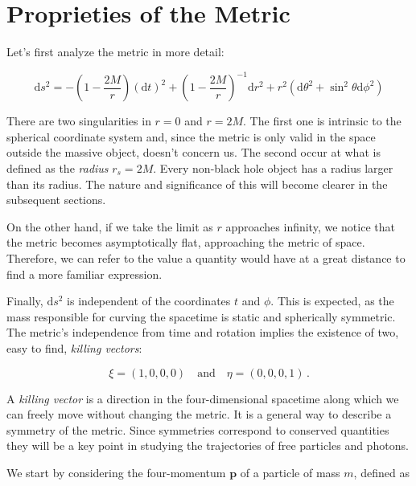 \newpage


\section{Proprieties of the Metric}

Let's first analyze the \Sh metric in more detail:

\begin{equation}
    \mathrm{d}s^2 = - \left(1 - \frac{2 M}{r} \right) (\mathrm{d}t)^2
    + \left(1 - \frac{2 M}{r} \right)^{-1} \mathrm{d}r^2
    + r^2 (\mathrm{d}\theta^2 + \sin^2 \theta \mathrm{d}\phi^2)
    \label{cap1:eq:Sh_ds}
\end{equation}

There are two singularities in $r = 0$ and $r = 2M$.
The first one is intrinsic to the spherical coordinate system and, since the
metric is only valid in the space outside the massive object, doesn't concern us.
The second occur at what is defined as the \textit{\Sh radius} $r_s = 2M$.
Every non-black hole object has a radius larger than its \Sh radius.
The nature and significance of this will become clearer in the subsequent
sections.

On the other hand, if we take the limit as $r$ approaches infinity, we notice
that the metric becomes asymptotically flat, approaching the metric of \Mi
space.
Therefore, we can refer to the value a quantity would have at a great distance
to find a more familiar expression.

Finally, $\mathrm{d}s^2$ is independent of the coordinates $t$ and $\phi$.
This is expected, as the mass responsible for curving the spacetime is static
and spherically symmetric.
The metric’s independence from time and rotation implies the existence of two,
easy to find, \textit{killing vectors}:

\begin{equation}
    \xi = (1, 0, 0, 0) \quad \text{and} \quad \eta = (0, 0, 0, 1) \, .
    \label{cap1:eq:xi_eta}
\end{equation}

A \textit{killing vector} is a direction in the four-dimensional spacetime
along which we can freely move without changing the metric.
It is a general way to describe a symmetry of the metric.
Since symmetries correspond to conserved quantities they will be a key point in
studying the trajectories of free particles and photons.

We start by considering the four-momentum $\mathbf{p}$ of a particle of mass
$m$, defined as

